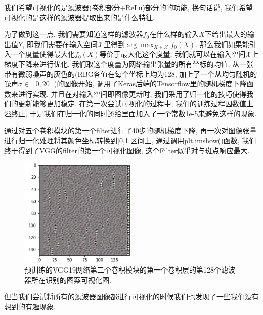 \documentclass[lang=cn,11pt]{elegantpaper}
\begin{document}
我们希望可视化的是滤波器(卷积部分$+$ReLu)部分的的功能, 换句话说, 我们希望可视化的是这样的滤波器提取出来的是什么特征. 

为了做到这一点, 我们需要知道这样的滤波器$f_0$在什么样的输入$X$下给出最大的输出值$Y$, 即我们需要在输入空间$\mathcal X$里得到$\arg \max_{X\in \mathcal X} f_0(X)$. 那么我们如果能引入一个度量使得最大化$f_0(X)$等价于最大化这个度量, 我们就可以在输入空间$\mathcal X$上梯度下降来进行优化. 我们取这个度量为网络输出张量的所有坐标的均值. 从一张带有微弱噪声的灰色的(RBG各值在每个坐标上均为128, 加上了一个从均匀随机的噪声$\sigma\in[0,20]$)的图像开始, 调用了Keras后端的Tensorflow里的随机梯度下降函数来进行实现. 并且在对输入空间即图像更新时, 我们采用了归一化的技巧使得我们的更新能够更加稳定. 在第一次尝试可视化的过程中, 我们的训练过程因数值上溢终止, 于是我们在归一化的同时还给里面加入了一个常数1e-5来避免这样的现象. 

通过对五个卷积模块的第一个filter进行了40步的随机梯度下降, 再一次对图像张量进行归一化处理将其颜色坐标转换到[0,1]区间上, 通过调用plt.imshow()函数, 我们终于得到了VGG的filter的第一个可视化图像, 这个Filter似乎对与斑点响应最大. 
\begin{figure}[htbp]
	\centering
  \hspace{-30pt}\includegraphics[width=0.5\textwidth]{block2_conv1_127.png}
  \tiny
  \caption{预训练的VGG19网络第二个卷积模块的第一个卷积层的第128个滤波器所在识别的图案可视化图.\label{fig:pretrain-singal}}
\end{figure}

\normalsize
但当我们尝试将所有的滤波器图像都进行可视化的时候我们也发现了一些我们没有想到的有趣现象.
\end{document}
